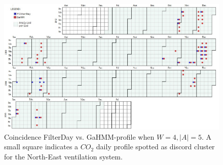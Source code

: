 \begin{landscape}
\leavevmode
\newline

\begin{figure}[h!]
  \vspace{0.5em} %
  \includegraphics[scale=0.80]{Figures/GaHMMvsSAX_w4a5.jpg}
  \caption{Coincidence FilterDay vs. GaHMM-profile when $W=4, |A|=5$. A small square indicates a $CO_2$ daily profile spotted as discord cluster for the North-East ventilation system.}
  \label{fig:FilterDay_GaHMM_calendar2}
\end{figure}





\end{landscape}
\restoregeometry








